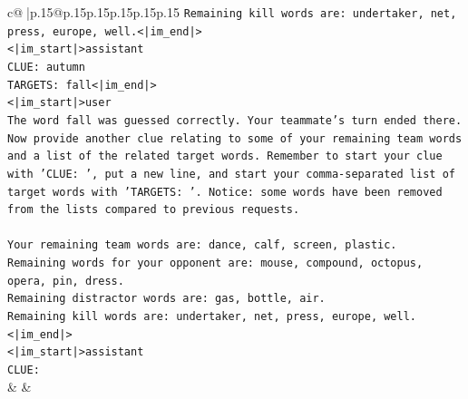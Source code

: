 \documentclass{article}
\begin{document}
{\begin{supertabular}{c@{$\;$}|p{.15\linewidth}@{}p{.15\linewidth}p{.15\linewidth}p{.15\linewidth}p{.15\linewidth}p{.15\linewidth}}
{{{\texttt{Remaining kill words are: undertaker, net, press, europe, well.<|im\_end|>} \\
\texttt{<|im\_start|>assistant} \\
\texttt{CLUE: autumn} \\
\texttt{TARGETS: fall<|im\_end|>} \\
\texttt{<|im\_start|>user} \\
\texttt{The word fall was guessed correctly. Your teammate's turn ended there.} \\
\texttt{Now provide another clue relating to some of your remaining team words and a list of the related target words. Remember to start your clue with 'CLUE: ', put a new line, and start your comma{-}separated list of target words with 'TARGETS: '. Notice: some words have been removed from the lists compared to previous requests.} \\
\\ 
\texttt{Your remaining team words are: dance, calf, screen, plastic.} \\
\texttt{Remaining words for your opponent are: mouse, compound, octopus, opera, pin, dress.} \\
\texttt{Remaining distractor words are: gas, bottle, air.} \\
\texttt{Remaining kill words are: undertaker, net, press, europe, well.<|im\_end|>} \\
\texttt{<|im\_start|>assistant} \\
\texttt{CLUE:} \\
            }
        }
    }
    & & \\ \\


\end{supertabular}}
\end{document}
